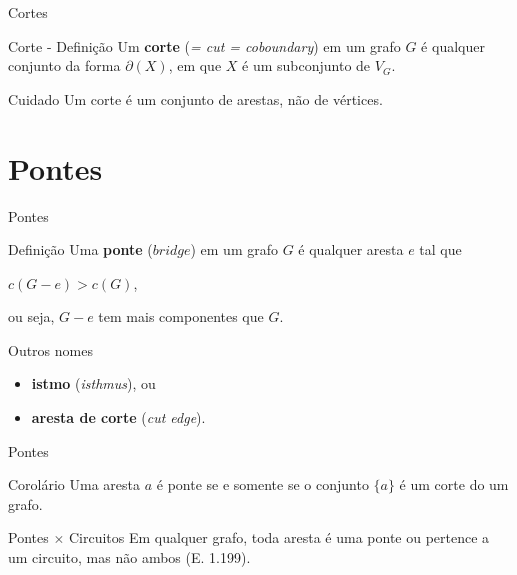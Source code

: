 \documentclass[xcolor=dvipsnames,table]{beamer}
\begin{document}
	\begin{frame}{Cortes}
		\begin{block}{Corte - Definição}
			Um {\bf corte} ({\it = cut = coboundary}) em um grafo $G$ é qualquer conjunto da forma $\partial(X)$, em que $X$ é um subconjunto de $V_G$.
		\end{block}   
		\begin{alertblock}{Cuidado}
			Um corte é um conjunto de arestas, não de vértices.
		\end{alertblock}
	\end{frame}

	\section{Pontes}
	\begin{frame}{Pontes}
		\begin{block}{Definição}
			Uma {\bf ponte} ($bridge$) em um grafo $G$ é qualquer aresta $e$ tal que 
			\begin{center}
				$c(G - e) > c(G)$,  
			\end{center}
			ou seja, $G - e$ tem mais componentes que $G$.				
		\end{block} \pause
		\begin{block}{Outros nomes}
			\begin{itemize}
				\item {\bf istmo} ({\it isthmus}), ou 
				\item {\bf aresta de corte} ({\it cut edge}).
			\end{itemize}
		\end{block}
	\end{frame}
	
	\begin{frame}{Pontes}
		\begin{block}{Corolário}
			Uma aresta $a$ é ponte se e somente se o conjunto $\{ a \}$ é um corte do um grafo.
		\end{block} \pause
		\begin{block}{Pontes $\times$ Circuitos}
			Em qualquer grafo, toda aresta é uma ponte ou pertence a um circuito, mas não ambos (E. 1.199).
		\end{block}
	\end{frame}
	
	\begin{frame}
		\titlepage
	\end{frame}
	
\end{document}
